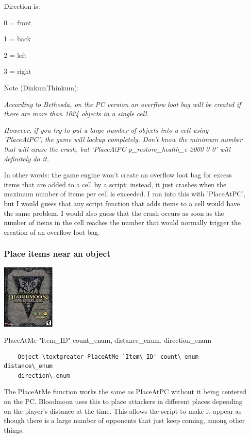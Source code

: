 Direction is:

0 = front

1 = back

2 = left

3 = right

Note (DinkumThinkum):

\emph{According to Bethesda, on the PC version an overflow loot bag will
be created if there are more than 1024 objects in a single cell.}

\emph{\hfill\break
However, if you try to put a large number of objects into a cell using
'PlaceAtPC', the game will lockup completely. Don't know the minimum
number that will cause the crash, but 'PlaceAtPC p\_restore\_health\_e
2000 0 0' will definitely do it.}%

In other words: the game engine won't create an overflow loot bag for
excess items that are added to a cell by a script; instead, it just
crashes when the maximum number of items per cell is exceeded. I ran
into this with 'PlaceAtPC', but I would guess that any script function
that adds items to a cell would have the same problem. I would also
guess that the crash occurs as soon as the number of items in the cell
reaches the number that would normally trigger the creation of an
overflow loot bag.

\hypertarget{place-items-near-an-object}{%
\subsubsection{Place items near an
object}\label{place-items-near-an-object}}

\includegraphics{media/image7.png}

PlaceAtMe "Item\_ID" count\_enum, distance\_enum, direction\_enum

\begin{lstlisting}
	Object-\textgreater PlaceAtMe `Item\_ID' count\_enum distance\_enum
	direction\_enum
\end{lstlisting}

The PlaceAtMe function works the same as PlaceAtPC without it being
centered on the PC. Bloodmoon uses this to place attackers in different
places depending on the player's distance at the time. This allows the
script to make it appear as though there is a large number of opponents
that just keep coming, among other things.

